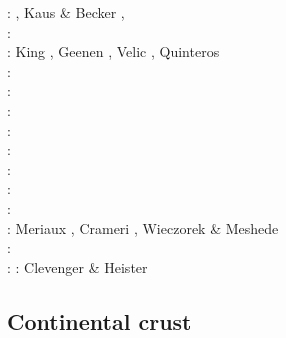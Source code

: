 \begin{scriptsize}
\twothousandseven: \cite{toma07}\cite{chcc07}, Kaus \& Becker \cite{kabe07}, \cite{kaks07}\cite{moql07}\cite{geyu07}\cite{dadh07}
      \cite{zldf07}\\
\twothousandeight: \cite{zhmt08}\cite{deka08}\cite{trub08}\cite{krdp08}\cite{mamo08}\cite{gepd98}
      \cite{vack08}\cite{heta08}\cite{brtf08}\cite{daks08}\cite{chzy08}\cite{tack08}\cite{hust08b}\\
\twothousandnine: King \cite{king09}, Geenen \etal \cite{geum09}, Velic \etal \cite{vemm09}, 
                  Quinteros \etal \cite{qurj09}\\
\twothousandten: \cite{kaus10}\cite{kamm10}\cite{egat10}\cite{kilv10}\\
\twothousandeleven: \cite{dumg11}\cite{uibb11}\cite{hegc11}\cite{muso11}\cite{dawk11}\cite{lemm11}\\
\twothousandtwelve: \cite{crsg12}\cite{chgv12}\cite{krwd12}\cite{may12}\cite{gerb12}\cite{asmo12}\\
\twothousandthirteen: \cite{chtl13}\cite{kemk13}\cite{gemd13}\cite{hutm13}\\
\twothousandfourteen: \cite{thmk14}\cite{mabl14}\cite{lopp14}\cite{stlh14}\\
\twothousandfifteen: \cite{lelk15}\cite{rumi15}\cite{chpe15}\cite{mabl15}\\
\twothousandsixteen: \cite{dumy16}\cite{blmp16}\\
\twothousandseventeen: \cite{robh17}\cite{wisv17}\cite{majc17}\\
\twothousandeighteen: Meriaux \etal \cite{memm18}, Crameri \cite{cram18}, Wieczorek \& Meshede \cite{wime18}\\
\twothousandnineteen: \cite{liki19}\cite{demh19}\cite{galb19}\cite{frtv19}\cite{yuwa19}\cite{ropu19}\\
\twothousandtwenty: \cite{homb20}\cite{trlb20}\cite{gadb20}\cite{jaca20a,jaca20b} 
\twothousandtwentyone: Clevenger \& Heister \cite{clhe21}
\end{scriptsize}



\subsection{Continental crust} 

